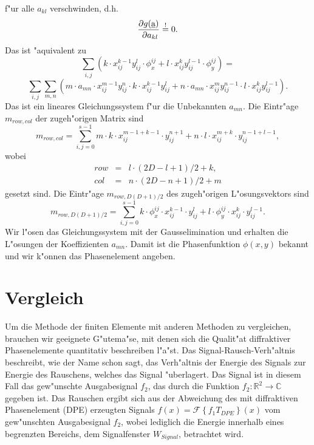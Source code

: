 \documentclass[11pt,a4paper]{article}
\newcommand{\R}{{\mathbb{R}}}
\newcommand{\C}{{\mathbb{C}}}
\begin{document}
    f"ur alle $a_{kl}$ verschwinden, d.h.
    $$ {\partial g(\underbar{a}) \over\ \partial a_{kl}} \stackrel{!}{=} 0. $$
    Das ist "aquivalent zu 
    $$ \sum_{i,j}\left( k\cdot x_{ij}^{k-1}y_{ij}^l\cdot \phi_x^{ij} +
                        l\cdot x_{ij}^ky_{ij}^{l-1}\cdot \phi_y^{ij} \right) = $$
    $$ \sum_{i,j}\sum_{m,n}\left( m\cdot a_{mn}\cdot x_{ij}^{m-1} y_{ij}^n \cdot k \cdot x_{ij}^{k-1} y_{ij}^l +
                                  n\cdot a_{mn}\cdot x_{ij}^m y_{ij}^{n-1} \cdot l \cdot x_{ij}^k y_{ij}^{l-1}
                           \right). $$
    Das ist ein lineares Gleichungssystem f"ur die Unbekannten $a_{mn}$. Die 
    Eintr"age $m_{row,col}$ der zugeh"origen Matrix sind 
    \begin{equation}
     m_{row, col} = \sum_{i,j=0}^{s-1} m \cdot k \cdot x_{ij}^{m-1+k-1} \cdot y_{ij}^{n+1} +
                                       n \cdot l \cdot x_{ij}^{m+k} \cdot y_{ij}^{n-1+l-1},
    \end{equation}
    wobei
    \begin{eqnarray*}
       row & = & l \cdot (2 D-l+1)/2+k,\\
       col & = & n \cdot (2 D-n+1)/2+m
    \end{eqnarray*}
    gesetzt sind. Die Eintr"age $m_{row, D(D+1)/2}$ des zugeh"origen L"osungsvektors sind
    \begin{equation}
      m_{row, D(D+1)/2} = \sum_{i,j=0}^{s-1} k \cdot \phi_x^{ij} \cdot x_{ij}^{k-1} \cdot y_{ij}^l +
                                             l \cdot \phi_y^{ij} \cdot x_{ij}^k     \cdot y_{ij}^{l-1}.
    \end{equation}
    Wir l"osen das Gleichungssystem mit der Gausselimination und erhalten die L"osungen der
    Koeffizienten $a_{mn}$. Damit ist die Phasenfunktion $\phi(x,y)$ bekannt und wir k"onnen das 
    Phasenelement angeben.
    
\section{Vergleich }
  Um die Methode der finiten Elemente mit anderen Methoden zu vergleichen, brauchen wir geeignete 
  G"utema"se, mit denen sich die Qualit"at diffraktiver Phasenelemente quantitativ beschreiben l"a"st. 
  Das Signal-Rausch-Verh"altnis beschreibt, wie der Name schon sagt, das Verh"altnis
  der Energie des Signals zur Energie des Rauschens, welches das Signal "uberlagert. Das Signal
  ist in diesem Fall das gew"unschte Ausgabesignal $f_2$, das durch die Funktion 
  $f_2 : \R^2 \rightarrow \C$ gegeben ist. Das Rauschen ergibt sich aus der Abweichung
  des mit diffraktiven Phasenelement (DPE) erzeugten Signals 
  $f(x)=\mathcal{F}\left\{f_1 T_{DPE}\right\}(x)$ vom 
  gew"unschten Ausgabesignal $f_2$, wobei lediglich die Energie innerhalb eines begrenzten Bereichs, 
  dem Signalfenster $W_{Signal}$, betrachtet wird.
\end{document}
